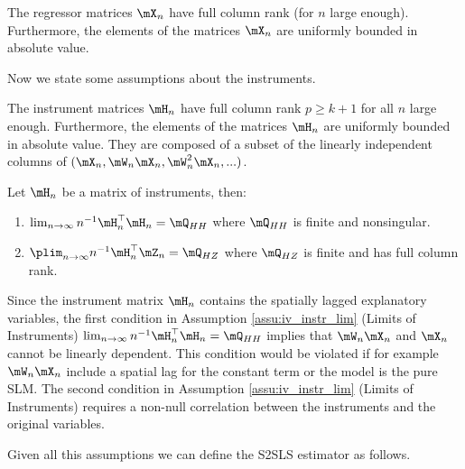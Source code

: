 \documentclass[english,12pt]{book}\usepackage[]{graphicx}\usepackage[]{xcolor}
\begin{document}
\begin{assumption}\label{assu:regressors}
The regressor matrices $\mX_n$ have full column rank (for $n$ large enough). Furthermore, the elements of the matrices $\mX_n$ are uniformly bounded in absolute value.
\end{assumption}

Now we state some assumptions about the instruments.

\begin{assumption}\label{assu:iv_instr}
The instrument matrices $\mH_n$ have full column rank $p \geq k + 1$ for all $n$ large enough. Furthermore, the elements of the matrices $\mH_n$ are uniformly bounded in absolute value. They are composed of a subset of the linearly independent columns of $(\mX_n, \mW_n\mX_n, \mW^2_n\mX_n, ...)$.
\end{assumption}

\begin{assumption}\label{assu:iv_instr_lim}
Let $\mH_n$ be a matrix of instruments, then:

\begin{enumerate}
  \item $\lim_{n\to \infty} n^{-1}\mH_n^\top\mH_n = \mQ_{HH}$ where $\mQ_{HH}$ is finite and nonsingular. 
  \item $\plim_{n\to \infty} n^{-1}\mH_n^\top\mZ_n = \mQ_{HZ}$ where $\mQ_{HZ}$ is finite and has full column rank.
\end{enumerate}
\end{assumption}

Since the instrument matrix $\mH_n$ contains the spatially lagged explanatory variables, the first condition in Assumption \ref{assu:iv_instr_lim} (Limits of Instruments) $\lim_{n\to \infty} n^{-1}\mH_n^\top\mH_n = \mQ_{HH}$ implies that $\mW_n\mX_n$ and $\mX_n$ cannot be linearly dependent. This condition would be violated if for example $\mW_n\mX_n$ include a spatial lag for the constant term or the model is the pure SLM.  The second condition in Assumption \ref{assu:iv_instr_lim} (Limits of Instruments) requires a non-null correlation between the instruments and the original variables.


Given all this assumptions we can define the S2SLS estimator as follows.
\end{document}
